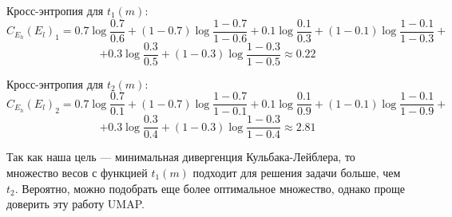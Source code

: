 Кросс-энтропия для $t_1(m)$:
\[C_{E_h}(E_l)_1 = 0.7\log \frac{0.7}{0.6} + (1-0.7)\log \frac{1-0.7}{1-0.6} + 0.1\log \frac{0.1}{0.3} + (1-0.1)\log \frac{1-0.1}{1-0.3}+\] \[+ 0.3\log \frac{0.3}{0.5} + (1-0.3)\log \frac{1-0.3}{1-0.5} \approx 0.22\]

Кросс-энтропия для $t_2(m)$:
\[C_{E_h}(E_l)_2 = 0.7\log \frac{0.7}{0.1} + (1-0.7)\log \frac{1-0.7}{1-0.1} + 0.1\log \frac{0.1}{0.9} + (1-0.1)\log \frac{1-0.1}{1-0.9} +\]\[+ 0.3\log \frac{0.3}{0.4} + (1-0.3)\log \frac{1-0.3}{1-0.4} \approx 2.81\]

Так как наша цель --- минимальная дивергенция Кульбака-Лейблера, то множество весов с функцией $t_1(m)$ подходит для решения задачи больше, чем $t_2$. Вероятно, можно подобрать еще более оптимальное множество, однако проще доверить эту работу UMAP.
